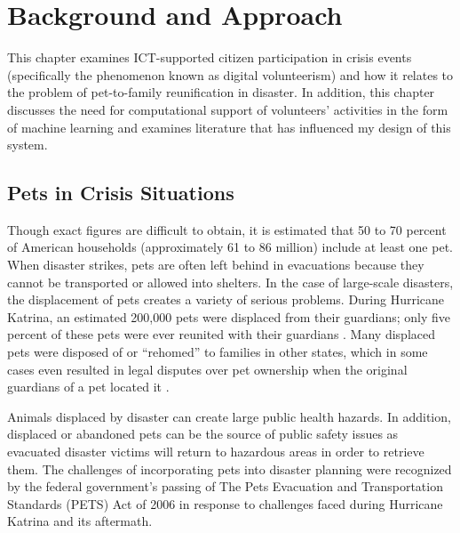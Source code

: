 \chapter{Background and Approach}
\label{background}

This chapter examines ICT-supported citizen participation in crisis events (specifically the phenomenon known as digital volunteerism) and how it relates to the problem of pet-to-family reunification in disaster.  In addition, this chapter discusses the need for computational support of volunteers' activities in the form of machine learning and examines literature that has influenced my design of this system.

\section {Pets in Crisis Situations}

Though exact figures are difficult to obtain, it is estimated that 50 to 70 percent of American households (approximately 61 to 86 million) include at least one pet.  When disaster strikes, pets are often left behind in evacuations because they cannot be transported or allowed into shelters.  In the case of large-scale disasters, the displacement of pets creates a variety of serious problems.  During Hurricane Katrina, an estimated 200,000 pets were displaced from their guardians; only five percent of these pets were ever reunited with their guardians \cite{lowe:petloss}.  Many displaced pets were disposed of or ``rehomed'' to families in other states, which in some cases even resulted in legal disputes over pet ownership when the original guardians of a pet located it \cite{mcnabb:courts}.  

Animals displaced by disaster can create large public health hazards.  In addition, displaced or abandoned pets can be the source of public safety issues as evacuated disaster victims will return to hazardous areas in order to retrieve them.  The challenges of incorporating pets into disaster planning were recognized by the federal government's passing of The Pets Evacuation and Transportation Standards (PETS) Act of 2006 in response to challenges faced during Hurricane Katrina and its aftermath.  

